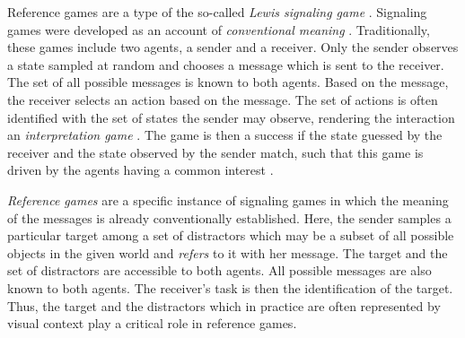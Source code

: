 Reference games are a type of the so-called \textit{Lewis signaling game} \parencite{lewis1969convention, skyrms2010signals}.
Signaling games were developed as an account of \textit{conventional meaning} \parencite{grice1975logic}. Traditionally, these games include two agents, a sender and a receiver. Only the sender observes a state sampled at random and chooses a message which is sent to the receiver. The set of all possible messages is known to both agents. Based on the message, the receiver selects an action based on the message. The set of actions is often identified with the set of states the sender may observe, rendering the interaction an \emph{interpretation game} \parencite{franke2016reasoning}. The game is then a success if the state guessed by the receiver and the state observed by the sender match, such that this game is driven by the agents having a common interest \parencite{lewis1969convention} \parencite[although see][for a relaxation of this assumption]{jager2014rationalizable}. 

\textit{Reference games} are a specific instance of signaling games in which the meaning of the messages is already conventionally established. Here, the sender samples a particular target among a set of distractors which may be a subset of all possible objects in the given world and \textit{refers} to it with her message. The target and the set of distractors are accessible to both agents. All possible messages are also known to both agents. The receiver's task is then the identification of the target. Thus, the target and the distractors which in practice are often represented by visual context play a critical role in reference games.

